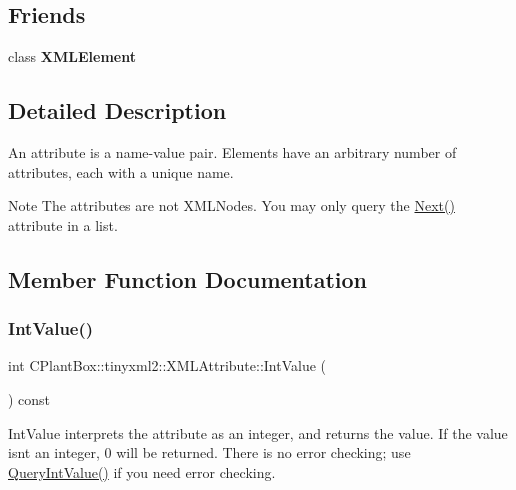 \subsection*{Friends}
\begin{DoxyCompactItemize}
\item 
\mbox{\label{classCPlantBox_1_1tinyxml2_1_1XMLAttribute_ac2fba9b6e452829dd892f7392c24e0eb}} 
class {\bfseries X\+M\+L\+Element}
\end{DoxyCompactItemize}


\subsection{Detailed Description}
An attribute is a name-\/value pair. Elements have an arbitrary number of attributes, each with a unique name.

\begin{DoxyNote}{Note}
The attributes are not X\+M\+L\+Nodes. You may only query the \hyperlink{classCPlantBox_1_1tinyxml2_1_1XMLAttribute_a0fbb0b77fc4e342dfdd42d21a4d991a7}{Next()} attribute in a list. 
\end{DoxyNote}


\subsection{Member Function Documentation}
\mbox{\label{classCPlantBox_1_1tinyxml2_1_1XMLAttribute_a1a8936a7d4abbbe620eb1171c624ada9}} 
\subsubsection{\texorpdfstring{Int\+Value()}{IntValue()}}
{\footnotesize\ttfamily int C\+Plant\+Box\+::tinyxml2\+::\+X\+M\+L\+Attribute\+::\+Int\+Value (\begin{DoxyParamCaption}{ }\end{DoxyParamCaption}) const\hspace{0.3cm}{\ttfamily [inline]}}

Int\+Value interprets the attribute as an integer, and returns the value. If the value isn\textquotesingle{}t an integer, 0 will be returned. There is no error checking; use \hyperlink{classCPlantBox_1_1tinyxml2_1_1XMLAttribute_a43a2d2ae04950d78843895a59565dbfd}{Query\+Int\+Value()} if you need error checking. \mbox{\label{classCPlantBox_1_1tinyxml2_1_1XMLAttribute_a43a2d2ae04950d78843895a59565dbfd}} 
